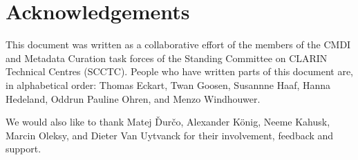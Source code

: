 \section{Acknowledgements}
This document was written as a collaborative effort of the members of the CMDI and Metadata Curation task forces of the Standing Committee on CLARIN Technical Centres (SCCTC). People who have written parts of this document are, in alphabetical order:
Thomas Eckart,
Twan Goosen,
Susannne Haaf, 
Hanna Hedeland,
Oddrun Pauline Ohren, 
and Menzo Windhouwer.

We would also like to thank 
Matej Ďurčo,
Alexander König,
Neeme Kahusk,
Marcin Oleksy,
and Dieter Van Uytvanck
for their involvement, feedback and support.